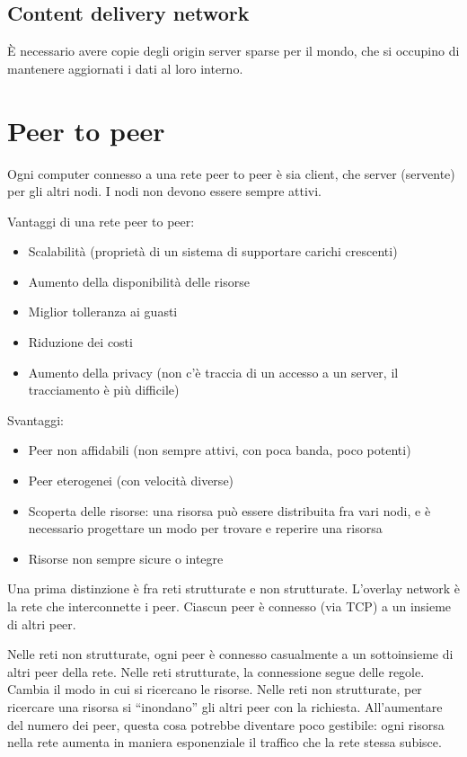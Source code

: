 \subsection{Content delivery network}

\`E necessario avere copie degli origin server sparse per il mondo, che si occupino di mantenere aggiornati i dati al loro interno.

\section{Peer to peer}

Ogni computer connesso a una rete peer to peer \`e sia client, che server (servente) per gli altri nodi. I nodi non devono essere sempre attivi.

Vantaggi di una rete peer to peer:
\begin{itemize}
    \item Scalabilit\`a (propriet\`a di un sistema di supportare carichi crescenti)
    \item Aumento della disponibilit\`a delle risorse
    \item Miglior tolleranza ai guasti
    \item Riduzione dei costi
    \item Aumento della privacy (non c'\`e traccia di un accesso a un server, il tracciamento \`e pi\`u difficile)
\end{itemize}

Svantaggi:
\begin{itemize}
    \item Peer non affidabili (non sempre attivi, con poca banda, poco potenti)
    \item Peer eterogenei (con velocit\`a diverse)
    \item Scoperta delle risorse: una risorsa pu\`o essere distribuita fra vari nodi, e \`e necessario progettare un modo per trovare e reperire una risorsa
    \item Risorse non sempre sicure o integre
\end{itemize}

Una prima distinzione \`e fra reti strutturate e non strutturate. L'overlay network \`e la rete  che interconnette i peer. Ciascun peer \`e connesso (via TCP) a un insieme di altri peer.

Nelle reti non strutturate, ogni peer \`e connesso casualmente a un sottoinsieme di altri peer della rete. Nelle reti strutturate, la connessione segue delle regole. Cambia il modo in cui si ricercano le risorse. Nelle reti non strutturate, per ricercare una risorsa si ``inondano'' gli altri peer con la richiesta. All'aumentare del numero dei peer, questa cosa potrebbe diventare poco gestibile: ogni risorsa nella rete aumenta in maniera esponenziale il traffico che la rete stessa subisce.


